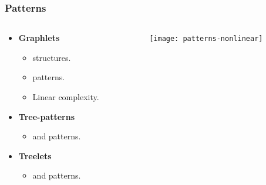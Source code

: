 \documentclass[11pt, pdf, compress, handout]{beamer}
\begin{document}
\begin{frame}
  \frametitle{Patterns}
  
  \begin{columns}
    \begin{column}{0.67\textwidth}

      \begin{itemize}
      \item \textbf{Graphlets \hspace{-0.3cm} \myinfbar \cite{CI-SHERVASHIDZE-2009}}
        \begin{itemize}
        \item[\itemplus]  structures.
        \item[\itemmoins]  patterns.
        \item[\itemplus] Linear complexity.
        \end{itemize}
        \vspace{.8cm}
      \item \textbf{Tree-patterns \hspace{-0.3cm} \myinf
          \cite{RI-MAHE-2009, RI-SHERVASHIDZE-2011}}
        \begin{itemize}
        \item[\itemplus]  and  patterns.
        \end{itemize}
        \vspace{.8cm}
      \item \textbf{Treelets \hspace{-0.3cm} \myinfbar \cite{RI-GAUZERE-2012}}
        \begin{itemize}
        \item[\itemplus]  and  patterns.
        \end{itemize}
      \end{itemize}
    \end{column}
    \begin{column}{0.32\textwidth}
      \texttt{[image: patterns-nonlinear]}
    \end{column}
  \end{columns}

\end{frame}
\end{document}
